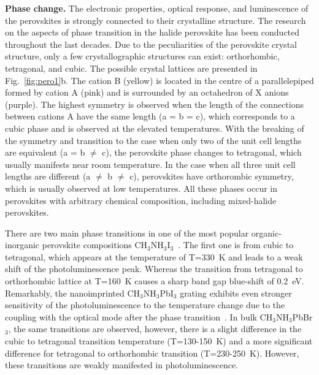\documentclass[journal=chreay,manuscript=review]{achemso}
\begin{document}
%
\textbf{Phase change.}
The electronic properties, optical response, and luminescence of the perovskites is strongly connected to their crystalline structure. The research on the aspects of phase transition in the halide perovskite has been conducted throughout the last decades\cite{hirotsu1971experimental, hirotsu1974structural, hirotsu1978elastic, fujii1974neutron,tovborg1969nqr}. 
Due to the peculiarities of the perovskite crystal structure, only a few crystallographic structures can exist: orthorhombic, tetragonal, and cubic. 
The possible crystal lattices are presented in Fig.~\ref{fig:pero1}b. The cation B (yellow) is located in the centre of a parallelepiped formed by cation A (pink) and is surrounded by an octahedron of X anions (purple). The highest symmetry is observed when the length of the connections between cations A have the same length (a = b = c), which corresponds to a cubic phase and is observed at the elevated temperatures. With the breaking of the symmetry and transition to the case when only two of the unit cell lengths are equivalent (a = b $\neq$ c), the perovskite phase changes to tetragonal, which usually manifests near room temperature. In the case when all three unit cell lengths are different (a $\neq$ b $\neq$ c), perovskites have orthorombic symmetry, which is usually observed at low temperatures. 
All these phases occur in perovskites with arbitrary chemical composition, including mixed-halide perovskites. 

There are two main phase transitions in one of the most popular organic-inorganic perovskite compositions CH$_3$NH$_3$I$_3$~\cite{whitfield2016structures}. The first one is from cubic to tetragonal, which appears at the temperature of T=330~K and leads to a weak shift of the photoluminescence peak. Whereas the transition from tetragonal to orthorhombic lattice at T=160~K causes a sharp band gap blue-shift of 0.2~eV. Remarkably, the nanoimprinted CH$_3$NH$_3$PbI$_3$ grating exhibits even stronger sensitivity of the photoluminescence to the temperature change due to the coupling with the optical mode after the phase transition~\cite{tiguntseva2019enhanced}. In bulk CH$_3$NH$_3$PbBr$_3$, the same transitions are observed, however, there is a slight difference in the cubic to tetragonal transition temperature (T=130-150~K) and a more significant difference for tetragonal to orthorhombic transition (T=230-250~K)\cite{liu2018temperature}. However, these transitions are weakly manifested in photoluminescence.
\end{document}
